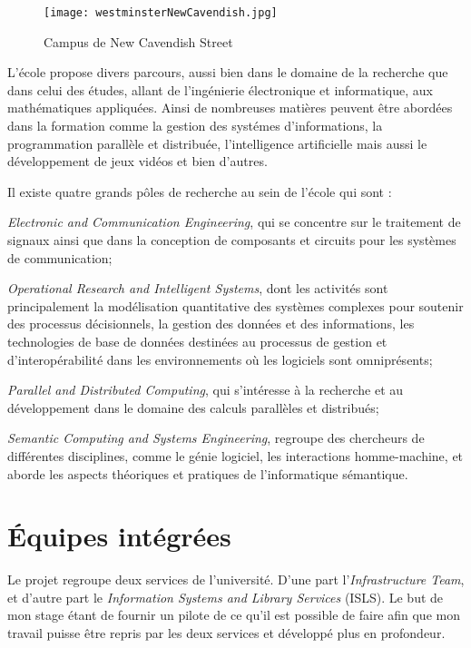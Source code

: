 \begin{figure}[!ht]
	\centering
	\texttt{[image: westminsterNewCavendish.jpg]}
	\caption{Campus de New Cavendish Street}
	\label{figure:westminsterNewCavendish}

\end{figure}

L'\'ecole propose divers parcours, aussi bien dans le domaine de la recherche que dans celui des \'etudes, allant de l'ing\'enierie \'electronique et informatique, aux math\'ematiques appliqu\'ees.
Ainsi de nombreuses mati\`eres peuvent \^etre abord\'ees dans la formation comme la gestion des syst\'emes d'informations, la programmation parall\`ele et distribu\'ee, l'intelligence artificielle mais aussi le d\'eveloppement de jeux vid\'eos et bien d'autres.

\noindent Il existe quatre grands p\^oles de recherche au sein de l'\'ecole qui sont :

\textit{Electronic and Communication Engineering}, qui se concentre sur le traitement de signaux ainsi que dans la conception de composants et circuits pour les syst\`emes de communication;

\textit{Operational Research and Intelligent Systems}, dont les activit\'es sont principalement la mod\'elisation quantitative des syst\`emes complexes pour soutenir des processus d\'ecisionnels, la gestion des donn\'ees et des informations, les technologies de base de donn\'ees destin\'ees au processus de gestion et d'interop\'erabilit\'e dans les environnements o\`u les logiciels sont omnipr\'esents;

\textit{Parallel and Distributed Computing}, qui s'int\'eresse \`a la recherche et au d\'eveloppement dans le domaine des calculs parall\`eles et distribu\'es;

\textit{Semantic Computing and Systems Engineering}, regroupe des chercheurs de diff\'erentes disciplines, comme le g\'enie logiciel, les interactions homme-machine, et aborde les aspects th\'eoriques et pratiques de l'informatique s\'emantique.

\section{\'Equipes int\'egr\'ees}

Le projet \YuukouII{} regroupe deux services de l'universit\'e. 
D'une part l'\textit{Infrastructure Team}, et d'autre part le \textit{Information Systems and Library Services} (ISLS).
Le but de mon stage \'etant de fournir un pilote de ce qu'il est possible de faire afin que mon travail puisse \^etre repris par les deux services et d\'evelopp\'e plus en profondeur.


